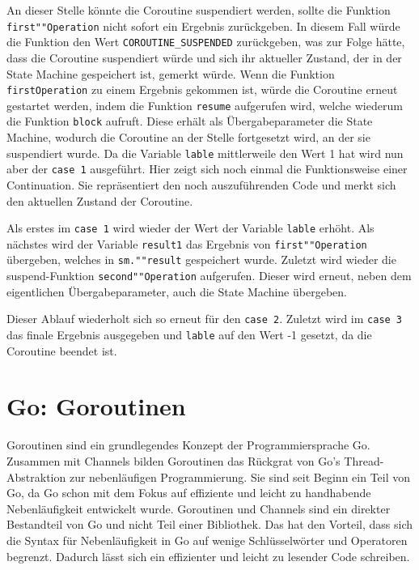 \documentclass[fontsize=12pt,paper=a4,twoside=semi,parskip=half-,headsepline,headinclude]{scrreprt}
\begin{document}
An dieser Stelle könnte die Coroutine suspendiert werden, sollte die Funktion \texttt{first""Operation} nicht sofort ein Ergebnis zurückgeben. In diesem Fall würde die Funktion den Wert \texttt{COROUTINE\_SUSPENDED} zurückgeben\cite{Akhin2024}, was zur Folge hätte, dass die Coroutine suspendiert würde und sich ihr aktueller Zustand, der in der State Machine gespeichert ist, gemerkt würde. Wenn die Funktion \texttt{firstOperation} zu einem Ergebnis gekommen ist, würde die Coroutine erneut gestartet werden, indem die Funktion \texttt{resume} aufgerufen wird, welche wiederum die Funktion \texttt{block} aufruft. Diese erhält als Übergabeparameter die State Machine, wodurch die Coroutine an der Stelle fortgesetzt wird, an der sie suspendiert wurde. Da die Variable \texttt{lable} mittlerweile den Wert 1 hat wird nun aber der \texttt{case 1} ausgeführt. Hier zeigt sich noch einmal die Funktionsweise einer Continuation. Sie repräsentiert den noch auszuführenden Code und merkt sich den aktuellen Zustand der Coroutine. 

Als erstes im \texttt{case 1} wird wieder der Wert der Variable \texttt{lable} erhöht. Als nächstes wird der Variable \texttt{result1} das Ergebnis von \texttt{first""Operation} übergeben, welches in \texttt{sm.""result} gespeichert wurde. Zuletzt wird wieder die suspend-Funktion \texttt{second""Operation} aufgerufen. Dieser wird erneut, neben dem eigentlichen Übergabeparameter, auch die State Machine übergeben.

Dieser Ablauf wiederholt sich so erneut für den \texttt{case 2}. Zuletzt wird im \texttt{case 3} das finale Ergebnis ausgegeben und \texttt{lable} auf den Wert -1 gesetzt, da die Coroutine beendet ist.

\newpage

\section{Go: Goroutinen}

Goroutinen sind ein grundlegendes Konzept der Programmiersprache Go. Zusammen mit Channels bilden Goroutinen das Rückgrat von Go's Thread-Abstraktion zur nebenläufigen Programmierung. Sie sind seit Beginn ein Teil von Go, da Go schon mit dem Fokus auf effiziente und leicht zu handhabende Nebenläufigkeit entwickelt wurde. Goroutinen und Channels sind ein direkter Bestandteil von Go und nicht Teil einer Bibliothek. Das hat den Vorteil, dass sich die Syntax für Nebenläufigkeit in Go auf wenige Schlüsselwörter und Operatoren begrenzt. Dadurch lässt sich ein effizienter und leicht zu lesender Code schreiben.
\end{document}
